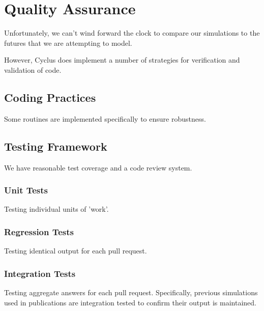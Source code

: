 \section{Quality Assurance}
%

%


Unfortunately, we can't wind forward the clock to compare our simulations to 
the futures that we are attempting to model.

However, Cyclus does implement a number of strategies for verification and 
validation of code.

\subsection{Coding Practices}

Some routines are implemented specifically to ensure robustness.

\subsection{Testing Framework}

We have reasonable test coverage and a code review system.

\subsubsection{Unit Tests}

Testing individual units of 'work'.

\subsubsection{Regression Tests}

Testing identical output for each pull request.

\subsubsection{Integration Tests} 

Testing aggregate answers for each pull request. Specifically, previous
simulations used in publications are integration tested to confirm their output
is maintained.

